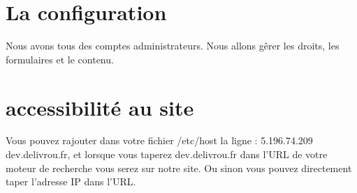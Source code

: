 \documentclass[a4paper,12pt]{report}
\begin{document}
\section{La configuration}
Nous avons tous des comptes administrateurs.
Nous allons gêrer les droits, les formulaires et le contenu.

\section{accessibilité au site}
Vous pouvez rajouter dans votre fichier /etc/host la ligne : 5.196.74.209    dev.delivrou.fr,
et lorsque vous taperez dev.delivrou.fr dans l'URL de votre moteur de recherche vous serez sur
notre site. Ou sinon vous pouvez directement taper l'adresse IP dans l'URL.
\end{document}
